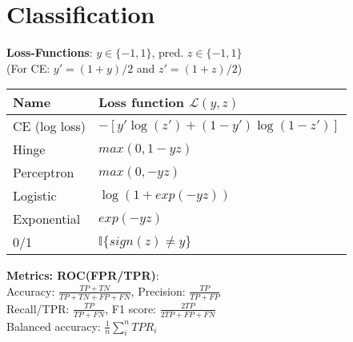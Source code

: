 \section{Classification}
\textbf{Loss-Functions}:
$y \in \{-1,1\}$, pred. $z \in \{-1,1\}$\\
(For CE: $y'=(1+y)/2$ and $z'=(1+z)/2$) 

    \begin{tabular}{ll}
    \hline
    \textbf{Name} & Loss function $\mathcal{L}(y,z)$ \\
    \hline
    CE (log loss) & $-[y'\log(z') {+} (1-y')\log(1-z')]$\\ 
    Hinge & $max(0, 1-yz)$ \\
    Perceptron & $max(0, -yz)$ \\
    Logistic & $\log(1 + exp(-yz))$ \\
    Exponential & $exp(-yz)$ \\
    0/1 & $\mathbb{I}\{sign(z)\neq y\}$
    \\
    \hline
    \end{tabular}

\textbf{Metrics: ROC(FPR/TPR)}:\\
Accuracy: $\frac{TP+TN}{TP+TN+FP+FN}$, Precision: $\frac{TP}{TP+FP}$\\ Recall/TPR: $\frac{TP}{TP+FN}$, F1 score: $\frac{2TP}{2TP+FP+FN}$\\
Balanced accuracy: $\frac{1}{n}\sum_i^n TPR_i$

